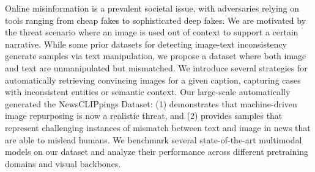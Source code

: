 Online misinformation is a prevalent societal issue, with adversaries relying on tools ranging from cheap fakes to sophisticated deep fakes. We are motivated by the threat scenario where an image is used out of context to support a certain narrative. While some prior datasets for detecting image-text inconsistency generate samples via text manipulation, we propose a dataset where both image and text are unmanipulated but mismatched. We introduce several strategies for automatically retrieving convincing images for a given caption, capturing cases with inconsistent entities or semantic context. Our large-scale automatically generated the NewsCLIPpings Dataset: (1) demonstrates that machine-driven image repurposing is now a realistic threat, and (2) provides samples that represent challenging instances of mismatch between text and image in news that are able to mislead humans. We benchmark several state-of-the-art multimodal models on our dataset and analyze their performance across different pretraining domains and visual backbones.

